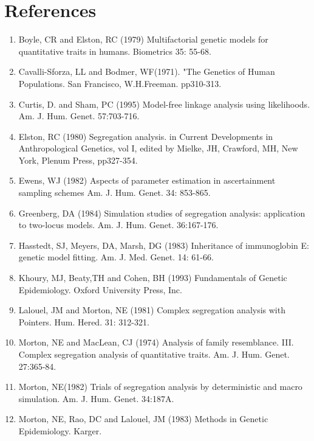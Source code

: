 \documentclass[12pt]{article}
\begin{document}
\section{References}
\begin{enumerate}
\item Boyle, CR and Elston, RC (1979) Multifactorial genetic models for quantitative traits
in humans. Biometrics 35: 55-68.

\item Cavalli-Sforza, LL and Bodmer, WF(1971). "The Genetics of Human Populations. San
Francisco, W.H.Freeman. pp310-313. 

\item Curtis, D. and Sham, PC (1995) Model-free linkage analysis using likelihoods. Am. J. 
Hum. Genet. 57:703-716. 

\item Elston, RC (1980) Segregation analysis. in Current Developments in Anthropological
Genetics, vol I, edited by Mielke, JH, Crawford, MH, New York, Plenum Press, pp327-354.

\item Ewens, WJ (1982) Aspects of parameter estimation in ascertainment sampling schemes
Am. J. Hum. Genet. 34: 853-865.

\item Greenberg, DA (1984) Simulation studies of segregation analysis: application to
two-locus models. Am. J. Hum. Genet. 36:167-176. 

\item Hasstedt, SJ, Meyers, DA, Marsh, DG (1983) Inheritance of immunoglobin E: genetic 
model fitting. Am. J. Med. Genet. 14: 61-66.

\item Khoury, MJ, Beaty,TH and Cohen, BH (1993) Fundamentals of Genetic Epidemiology. Oxford
University Press, Inc. 

\item Lalouel, JM and Morton, NE (1981) Complex segregation analysis with Pointers. Hum. 
Hered. 31: 312-321. 

\item Morton, NE and MacLean, CJ (1974) Analysis of family resemblance. III. Complex
segregation analysis of quantitative traits. Am. J. Hum. Genet. 27:365-84. 

\item Morton, NE(1982) Trials of segregation analysis by deterministic and macro
simulation. Am. J. Hum. Genet. 34:187A.

\item Morton, NE, Rao, DC and Lalouel, JM (1983) Methods in Genetic Epidemiology. Karger. 


\end{enumerate}
\end{document}

